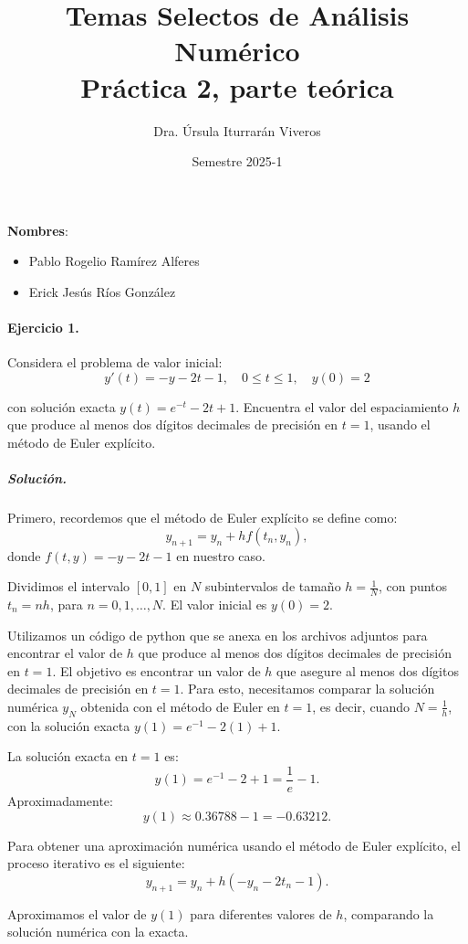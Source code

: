 \documentclass[12pt,letterpaper,oneside]{article}
\title{Temas Selectos de Análisis Numérico\\Práctica 2, parte teórica}
\author{Dra. Úrsula Iturrarán Viveros}
\date{Semestre 2025-1}
\begin{document}
\maketitle
\textbf{Nombres}:
\begin{itemize}
    \item Pablo Rogelio Ramírez Alferes
    \item Erick Jesús Ríos González
\end{itemize}
\paragraph*{Ejercicio 1.} Considera el problema de valor inicial:
\begin{equation}
y'(t) = -y-2t-1,\quad 0\leq t\leq 1,\quad y(0) = 2 \label{eq-1}
\end{equation}

\noindent con solución exacta $y(t) = e^{-t} - 2t + 1$. Encuentra el valor del espaciamiento $h$ que produce al menos dos dígitos decimales de precisión en $t=1$, usando el método de Euler explícito.

\subparagraph*{Solución.}

Primero, recordemos que el método de Euler explícito se define como:
\[
y_{n+1} = y_n + h f(t_n, y_n),
\]
donde \( f(t, y) = -y - 2t - 1 \) en nuestro caso.

Dividimos el intervalo \( [0, 1] \) en \( N \) subintervalos de tamaño \( h = \frac{1}{N} \), con puntos \( t_n = nh \), para \( n = 0, 1, \dots, N \). El valor inicial es \( y(0) = 2 \).

Utilizamos un código de python que se anexa en los archivos adjuntos para encontrar el valor de \( h \) que produce al menos dos dígitos decimales de precisión en \( t = 1 \).
El objetivo es encontrar un valor de \( h \) que asegure al menos dos dígitos decimales de precisión en \( t = 1 \). Para esto, necesitamos comparar la solución numérica \( y_N \) obtenida con el método de Euler en \( t = 1 \), es decir, cuando \( N = \frac{1}{h} \), con la solución exacta \( y(1) = e^{-1} - 2(1) + 1 \).

La solución exacta en \( t = 1 \) es:
\[
y(1) = e^{-1} - 2 + 1 = \frac{1}{e} - 1.
\]
Aproximadamente:
\[
y(1) \approx 0.36788 - 1 = -0.63212.
\]

Para obtener una aproximación numérica usando el método de Euler explícito, el proceso iterativo es el siguiente:
\[
y_{n+1} = y_n + h (-y_n - 2t_n - 1).
\]

Aproximamos el valor de \( y(1) \) para diferentes valores de \( h \), comparando la solución numérica con la exacta.
\end{document}
